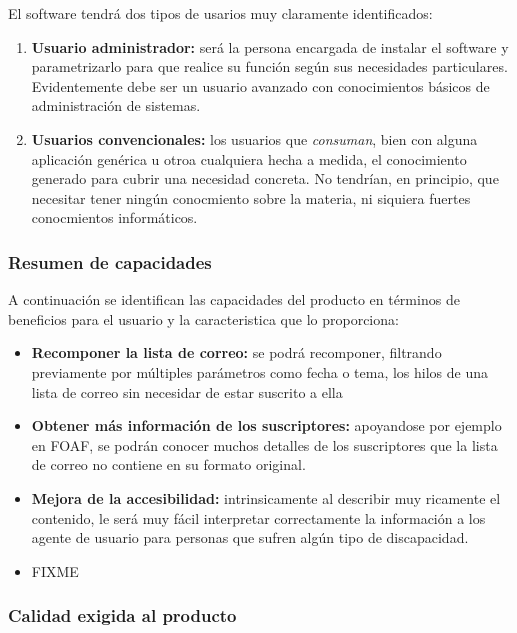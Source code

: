 El software tendrá dos tipos de usarios muy claramente identificados:

\begin{enumerate}
  \item \textbf{Usuario administrador:} será la persona encargada de
	instalar el software y parametrizarlo para que realice su
	función según sus necesidades particulares. Evidentemente debe
	ser un usuario avanzado con conocimientos básicos de administración
	de sistemas.
  \item \textbf{Usuarios convencionales:} los usuarios que \emph{consuman},
	bien con alguna aplicación genérica u otroa cualquiera hecha a medida,
	el conocimiento generado para cubrir una necesidad concreta. No
	tendrían, en principio, que necesitar tener ningún conocmiento 
	sobre la materia, ni siquiera fuertes conocmientos informáticos.
\end{enumerate}

\subsubsection{Resumen de capacidades}

A continuación se identifican las capacidades del producto en términos de 
beneficios para el usuario y la caracteristica que lo proporciona:

\begin{itemize}
  \item \textbf{Recomponer la lista de correo:} se podrá recomponer, filtrando 
	previamente por múltiples parámetros como fecha o tema, los hilos de una 
	lista de correo sin necesidar de estar suscrito a ella
  \item \textbf{Obtener más información de los suscriptores:} apoyandose por 
	ejemplo en FOAF, se podrán conocer muchos detalles de los suscriptores 
	que la lista de correo no contiene en su formato original.
  \item \textbf{Mejora de la accesibilidad:} intrinsicamente al describir muy 
	ricamente el contenido, le será muy fácil interpretar correctamente 
	la información a los agente de usuario para personas que sufren algún 
	tipo de discapacidad.
  \item FIXME
\end{itemize}

\subsubsection{Calidad exigida al producto}

